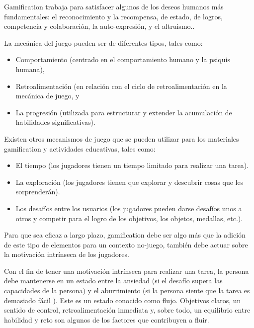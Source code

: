 Gamification trabaja para satisfacer algunos de los deseos humanos más
fundamentales: el reconocimiento y la recompensa, de estado, de logros,
competencia y colaboración, la auto-expresión, y el
altruismo.\cite{breaking:gamification}.

La mecánica del juego pueden ser de diferentes
tipos\cite{breaking:gamification}, tales como:

\begin{itemize}
    \item Comportamiento (centrado en el comportamiento humano y la psiquis
        humana),
    \item Retroalimentación (en relación con el ciclo de retroalimentación en la
        mecánica de juego, y
    \item La progresión (utilizada para estructurar y extender la acumulación de
        habilidades significativas).
\end{itemize}


Existen otros mecanismos de juego que se pueden utilizar para los materiales
gamification y actividades educativas\cite{breaking:gamification}, tales como:

\begin{itemize}
    \item El tiempo (los jugadores tienen un tiempo limitado para realizar una
        tarea).
    \item La exploración (los jugadores tienen que explorar y descubrir cosas
        que les sorprenderán).
    \item Los desafíos entre los usuarios (los jugadores pueden darse desafíos
        unos a otros y competir para el logro de los objetivos, los objetos,
        medallas, etc.).
\end{itemize}

Para que sea eficaz a largo plazo, gamification debe ser algo más que la adición
de este tipo de elementos para un contexto no-juego, también debe actuar sobre
la motivación intrínseca de los jugadores\cite{framework:gamification}. 

Con el fin de tener una motivación intrínseca para realizar una tarea, la
persona debe mantenerse en un estado entre la ansiedad (si el desafío supera las
capacidades de la persona) y el aburrimiento (si la persona siente que la tarea
es demasiado fácil ). Este es un estado conocido como flujo. Objetivos claros,
un sentido de control, retroalimentación inmediata y, sobre todo, un equilibrio
entre habilidad y reto son algunos de los factores que contribuyen a
fluir\cite{framework:gamification}.

